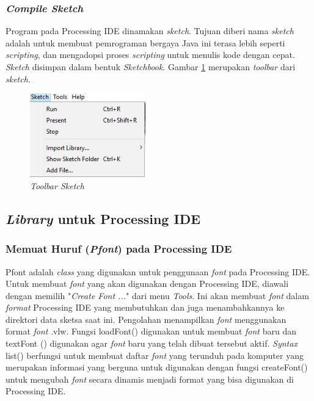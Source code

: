 \subsubsection{ \textit{Compile Sketch} }
Program pada Processing IDE dinamakan \textit{sketch}. Tujuan diberi nama \textit{sketch} adalah untuk membuat pemrograman bergaya Java ini terasa lebih seperti \textit{scripting}, dan mengadopsi proses \textit{scripting} untuk menulis kode dengan cepat. \textit{Sketch} disimpan dalam bentuk \textit{Sketchbook}. Gambar \ref{pic.toolbarsketch} merupakan \textit{toolbar} dari \textit{sketch.}

\begin{figure}[H]
	\centering
	\includegraphics[width=5cm]{gambar/compile.jpg}
	\caption{\textit{Toolbar Sketch}}
	\label{pic.toolbarsketch}
\end{figure}

\subsection{ \textit{Library} untuk Processing IDE }
\subsubsection{ Memuat Huruf (\textit{Pfont}) pada Processing IDE }
Pfont adalah \textit{class} yang digunakan untuk penggunaan \textit{font} pada Processing IDE. Untuk membuat \textit{font} yang akan digunakan dengan Processing IDE, diawali dengan memilih "\textit{Create Font ...}" dari menu \textit{Tools}. Ini akan membuat \textit{font} dalam \textit{format} Processing IDE yang membutuhkan dan juga menambahkannya ke direktori data sketsa saat ini. Pengolahan menampilkan \textit{font} menggunakan format \textit{font} .vlw. Fungsi loadFont() digunakan untuk membuat \textit{font} baru dan textFont () digunakan agar \textit{font} baru yang telah dibuat tersebut aktif. \textit{Syntax} list() berfungsi untuk membuat daftar \textit{font} yang terunduh pada komputer yang merupakan informasi yang berguna untuk digunakan dengan fungsi createFont() untuk mengubah \textit{font} secara dinamis menjadi format yang bisa digunakan di Processing IDE. 


